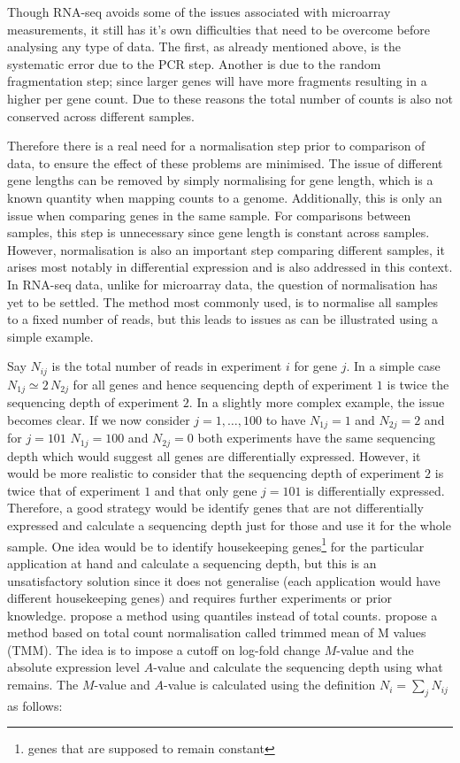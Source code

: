 Though RNA-seq avoids some of the issues associated with microarray measurements, it still has it's own difficulties that need to be overcome before analysing any type of data. The first, as already mentioned above, is the systematic error due to the PCR step. Another is due to the random fragmentation step; since larger genes will have more fragments resulting in a higher per gene count. Due to these reasons the total number of counts is also not conserved across different samples.

Therefore there is a real need for a normalisation step prior to comparison of data, to ensure the effect of these problems are minimised. The issue of different gene lengths can be removed by simply normalising for gene length, which is a known quantity when  mapping counts to a genome. Additionally, this is only an issue when comparing genes in the same sample. For comparisons between samples, this step is unnecessary since gene length is constant across samples. However, normalisation is also an important step comparing different samples, it arises most notably in differential expression and is also addressed in this context. In RNA-seq data, unlike for microarray data, the question of normalisation has yet to be settled. The method most commonly used, is to normalise all samples to a fixed number of reads, but this leads to issues as can be illustrated using a simple example.

Say $N_{ij}$ is the total number of reads in experiment $i$ for gene $j$. In a simple case $N_{1j} \simeq 2 \, N_{2j}$ for all genes and hence sequencing depth of experiment $1$ is twice the sequencing depth of experiment $2$. In a slightly more complex example, the issue becomes clear. If we now consider $j = 1, \ldots,  100$ to have $N_{1j} = 1$ and $N_{2j} = 2$ and for $j = 101$ $N_{1j} = 100$ and $N_{2j} = 0$ both experiments have the same sequencing depth which would suggest all genes are differentially expressed. However, it would be more realistic to consider that the sequencing depth of experiment $2$ is twice that of experiment $1$ and that only gene $j = 101$ is differentially expressed. Therefore, a good strategy would be identify genes that are not differentially expressed and calculate a sequencing depth just for those and use it for the whole sample. One idea would be to identify housekeeping genes\footnote{genes that are supposed to remain constant} for the particular application at hand and calculate a sequencing depth, but this is an unsatisfactory solution since it does not generalise (each application would have different housekeeping genes) and requires further experiments or prior knowledge. \cite{Bullard:2010go} propose a method using quantiles instead of total counts. \cite{Robinson:2010dd} propose a method based on total count normalisation called trimmed mean of M values (TMM). The idea is to impose a cutoff on log-fold change $M$-value and the absolute expression level $A$-value and calculate the sequencing depth using what remains. The $M$-value  and $A$-value is calculated using the definition $N_i = \sum_j N_{ij} $ as follows:

